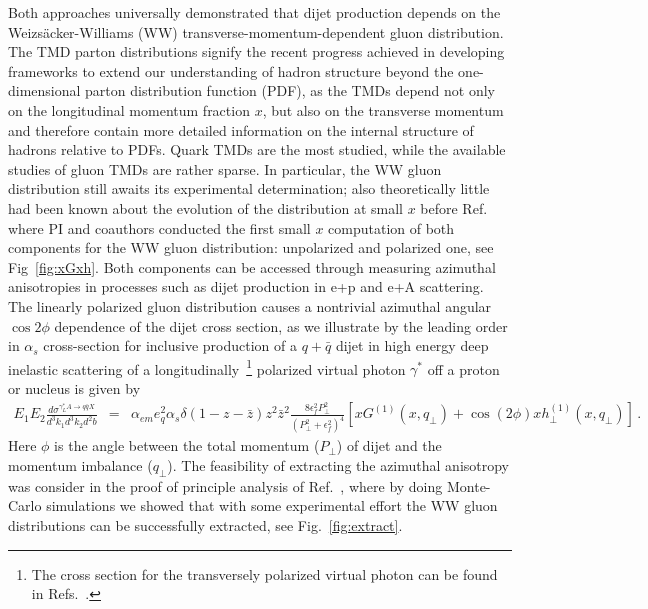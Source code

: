 Both approaches universally demonstrated that  dijet production depends on   
the Weiz\-s\"acker-Williams (WW) transverse-momentum-dependent  gluon distribution.  
The TMD parton distributions signify the recent progress achieved in developing 
frameworks to extend our understanding of hadron structure  beyond the one-dimensional
parton distribution function (PDF), as the TMDs depend not only on the longitudinal momentum 
fraction $x$, but also on the transverse momentum and therefore contain more 
detailed information on the internal structure of hadrons relative to PDFs.
Quark TMDs are the most studied, while the available studies of gluon TMDs 
are rather sparse. In particular, the WW gluon distribution still awaits its experimental 
determination; also theoretically little had been known about the evolution of the distribution at small $x$ 
before Ref.~\cite{Dumitru:2015gaa} where PI and coauthors conducted the first small $x$ computation of 
both components for the WW gluon distribution: unpolarized and polarized one, see Fig~\ref{fig:xGxh}. 
Both components can be accessed through measuring azimuthal anisotropies in processes 
such as dijet production in e+p and e+A scattering. The linearly polarized
gluon distribution causes  a nontrivial azimuthal angular $\cos 2\phi$ dependence of the dijet cross section, 
as we illustrate by the leading order in $\alpha_s$  cross-section for inclusive
production of a $q+\bar q$ dijet in high energy deep inelastic
scattering of a longitudinally~\footnote{The cross section for the transversely polarized virtual photon can be found in Refs.~\cite{Metz:2011wb,Dominguez:2011wm}.} polarized virtual photon $\gamma^*$ off a proton or nucleus is
given by~\cite{Metz:2011wb,Dominguez:2011wm}
\begin{eqnarray}
E_1E_2
\frac{d\sigma ^{\gamma _{L}^{\ast }A\rightarrow q\bar{q}X}}{d^3k_1d^3k_2 d^2b}
&=&\alpha _{em}e_{q}^{2}\alpha _{s}\delta \left( 1-z-\bar z\right) z^2\bar z^2\frac{8\epsilon _{f}^{2}{P}_{\perp }^{2}}{(
{P}_{\perp }^{2}+\epsilon _{f}^{2})^{4}}  %
\left[ xG^{(1)}(x,q_{\perp })+\cos \left(2
  \phi\right)xh_{\perp }^{(1)}(x,q_{\perp })\right]\, .
\label{eq:dijet_L}
\end{eqnarray}
Here $\phi$ is the angle between the total momentum  ($P_\perp$) of dijet and the momentum imbalance  ($q_\perp$).
The feasibility of extracting the azimuthal anisotropy was 
consider in the proof of principle analysis of  Ref.~\cite{Dumitru:2018kuw}, where by doing Monte-Carlo simulations 
we showed that with some experimental effort the WW gluon distributions can
be successfully extracted, see Fig.~\ref{fig:extract}.

